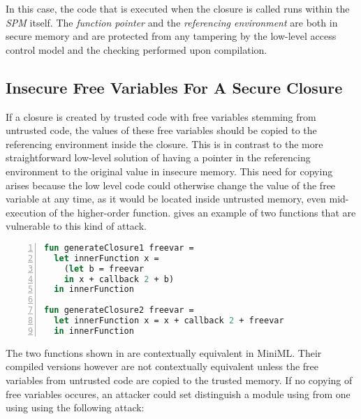 \documentclass[10pt,a4paper,master=cws, masteroption=ai,english,inputenc=utf8]{kulemt}
\begin{document}
In this case, the code that is executed when the closure is called runs within the \emph{SPM} itself.
The \emph{function pointer} and the \emph{referencing environment} are both in secure memory and are protected from any tampering by the low-level access control model and the checking performed upon compilation.

\subsection{Insecure Free Variables For A Secure Closure}
If a closure is created by trusted code with free variables stemming from untrusted code, the values of these free variables should be copied to the referencing environment inside the closure. This is in contrast to the more straightforward low-level solution of having a pointer in the referencing environment to the original value in insecure memory.
This need for copying arises because the low level code could otherwise change the value of the free variable at any time, as it would be located inside untrusted memory, even mid-execution of the higher-order function.
 gives an example of two functions that are vulnerable to this kind of attack.

\begin{lstlisting}[frame=single, language=ML,caption=Changing free variables inside untrusted memory mid-execution can break contextual equivalence., label=code:CopyFreeVariables,numbers=left]
fun generateClosure1 freevar =
  let innerFunction x =
    (let b = freevar
    in x + callback 2 + b)
  in innerFunction

fun generateClosure2 freevar = 
  let innerFunction x = x + callback 2 + freevar
  in innerFunction
\end{lstlisting}
\label{code:CopyFreeVariables}

The two functions shown in  are contextually equivalent in \mbox{MiniML}.
Their compiled versions however are not contextually equivalent unless the free variables from untrusted code are copied to the trusted memory.
If no copying of free variables occures, an attacker could set distinguish a module using  from one using  using the following attack:
\end{document}
